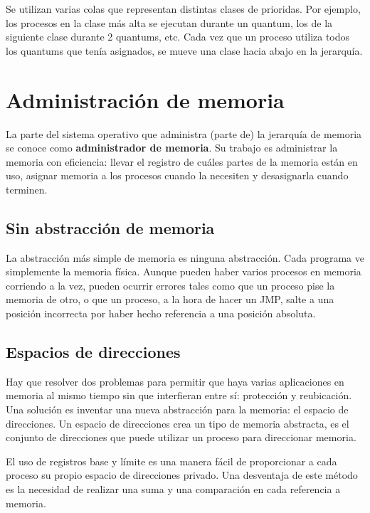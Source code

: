 Se utilizan varias colas que representan distintas clases de prioridas. Por ejemplo, los procesos en la clase más alta se ejecutan durante un quantum, los de la siguiente clase durante 2 quantums, etc. Cada vez que un proceso utiliza todos los quantums que tenía asignados, se mueve una clase hacia abajo en la jerarquía.

\newpage

\section{Administración de memoria}

La parte del sistema operativo que administra (parte de) la jerarquía de memoria se conoce como \textbf{administrador de memoria}. Su trabajo es administrar la memoria con eficiencia: llevar el registro de cuáles partes de la memoria están en uso, asignar memoria a los procesos cuando la necesiten y desasignarla cuando terminen.

\subsection{Sin abstracción de memoria}

La abstracción más simple de memoria es ninguna abstracción. Cada programa ve simplemente la memoria física. Aunque pueden haber varios procesos en memoria corriendo a la vez, pueden ocurrir errores tales como que un proceso pise la memoria de otro, o que un proceso, a la hora de hacer un JMP, salte a una posición incorrecta por haber hecho referencia a una posición absoluta.

\subsection{Espacios de direcciones}

Hay que resolver dos problemas para permitir que haya varias aplicaciones en memoria al mismo tiempo sin que interfieran entre sí: protección y reubicación. Una solución es inventar una nueva abstracción para la memoria: el espacio de direcciones. Un espacio de direcciones crea un tipo de memoria abstracta, es el conjunto de direcciones que puede utilizar un proceso para direccionar memoria.

El uso de registros base y límite es una manera fácil de proporcionar a cada proceso su propio espacio de direcciones privado. Una desventaja de este método es la necesidad de realizar una suma y una comparación en cada referencia a memoria.

